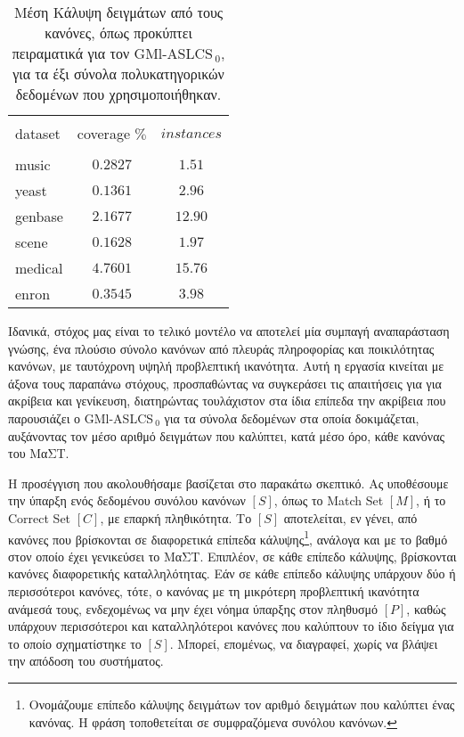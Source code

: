 \begin{table}[!h]
\begin{center}
\caption{Μέση Κάλυψη δειγμάτων από τους κανόνες, όπως προκύπτει πειραματικά για τον GMl-ASLCS$_{\:0}$, για τα έξι σύνολα πολυκατηγορικών δεδομένων που χρησιμοποιήθηκαν.}
\label{table:gmlaslcs0coverageForgmlaslcs}
    \begin{tabular}{l|cc}
    \hline \\ [-2ex]
    dataset & coverage $\%$       & $instances$ \\
    \hline \\ [-2ex]
    music   & $0.2827$  & $1.51$          	\\
    yeast   & $0.1361$  & $2.96$       		\\
    genbase & $2.1677$  & $12.90$          	\\
    scene   & $0.1628$  & $1.97$        	\\
    medical & $4.7601$  & $15.76$          	\\
    enron   & $0.3545$  & $3.98$        	\\ 
    \hline
    \end{tabular}
\end{center}
\end{table}


Ιδανικά, στόχος μας είναι το τελικό μοντέλο να αποτελεί μία συμπαγή αναπαράσταση γνώσης, ένα πλούσιο σύνολο κανόνων από πλευράς πληροφορίας και ποικιλότητας κανόνων, με ταυτόχρονη υψηλή προβλεπτική ικανότητα. Αυτή η εργασία κινείται με άξονα τους παραπάνω στόχους, προσπαθώντας να συγκεράσει τις απαιτήσεις για για ακρίβεια και γενίκευση, διατηρώντας τουλάχιστον στα ίδια επίπεδα την ακρίβεια που παρουσιάζει ο GMl-ASLCS$_{\:0}$ για τα σύνολα δεδομένων στα οποία δοκιμάζεται, αυξάνοντας τον μέσο αριθμό δειγμάτων που καλύπτει, κατά μέσο όρο, κάθε κανόνας του ΜαΣΤ. 

Η προσέγγιση που ακολουθήσαμε βασίζεται στο παρακάτω σκεπτικό. Ας υποθέσουμε την ύπαρξη ενός δεδομένου συνόλου κανόνων $[S]$, όπως το Match Set $[M]$, ή το Correct Set $[C]$, με επαρκή πληθικότητα. Το $[S]$ αποτελείται, εν γένει, από κανόνες που βρίσκονται σε διαφορετικά επίπεδα κάλυψης\footnote{Ονομάζουμε επίπεδο κάλυψης δειγμάτων τον αριθμό δειγμάτων που καλύπτει ένας κανόνας. Η φράση τοποθετείται σε συμφραζόμενα συνόλου κανόνων.}, ανάλογα και με το βαθμό στον οποίο έχει γενικεύσει το ΜαΣΤ. Επιπλέον, σε κάθε επίπεδο κάλυψης, βρίσκονται κανόνες διαφορετικής καταλληλότητας. Εάν σε κάθε επίπεδο κάλυψης υπάρχουν δύο ή περισσότεροι κανόνες, τότε, ο κανόνας με τη μικρότερη προβλεπτική ικανότητα ανάμεσά τους, ενδεχομένως να μην έχει νόημα ύπαρξης στον πληθυσμό $[P]$, καθώς υπάρχουν περισσότεροι και καταλληλότεροι κανόνες που καλύπτουν το ίδιο δείγμα για το οποίο σχηματίστηκε το $[S]$. Μπορεί, επομένως, να διαγραφεί, χωρίς να βλάψει την απόδοση του συστήματος. 

